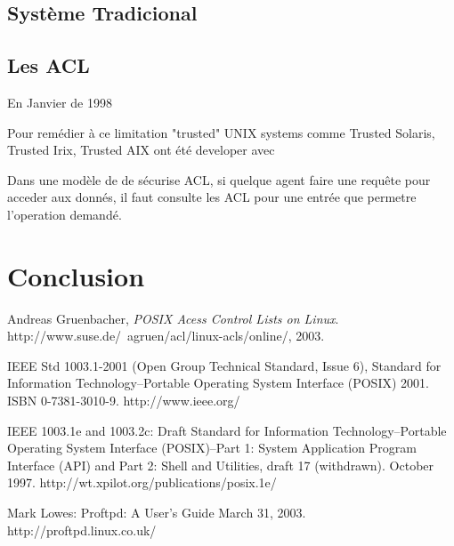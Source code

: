 \documentclass[draft]{article}
\begin{document}

\subsection*{Système Tradicional}


\subsection*{Les ACL}

%


En Janvier de 1998\cite{aclsuse}

Pour remédier à ce limitation "trusted" UNIX systems comme Trusted Solaris, Trusted Irix, Trusted AIX ont été developer avec 

Dans une modèle de de sécurise ACL, si quelque agent faire une requête pour acceder aux donnés, il faut consulte les ACL pour une entrée que permetre l'operation demandé.    



\section*{Conclusion}

\begin{thebibliography}{9}


 
  Andreas Gruenbacher,
  \emph{POSIX Acess Control Lists on Linux}.
  http://www.suse.de/~agruen/acl/linux-acls/online/,
  2003.

    IEEE Std 1003.1-2001 (Open Group Technical Standard, Issue 6), 
	Standard for Information Technology--Portable Operating System Interface (POSIX) 2001. 
	ISBN 0-7381-3010-9. 
	http://www.ieee.org/

    IEEE 1003.1e and 1003.2c: Draft Standard for Information Technology--Portable Operating System Interface (POSIX)--Part 1: System Application Program Interface (API) and Part 2: Shell and Utilities, draft 17 (withdrawn). 
	October 1997. 
	http://wt.xpilot.org/publications/posix.1e/

	Mark Lowes: 
	Proftpd: 
	A User's Guide March 31, 2003. 
	http://proftpd.linux.co.uk/

\end{thebibliography}


\end{document}
